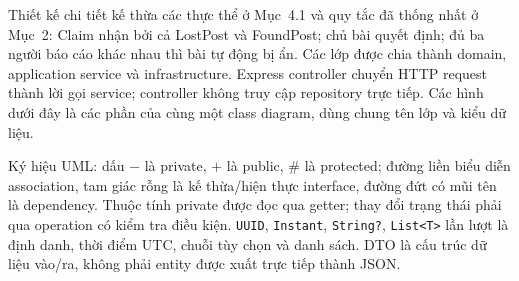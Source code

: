 Thiết kế chi tiết kế thừa các thực thể ở Mục~4.1 và quy tắc đã thống nhất ở Mục~2: Claim nhận bởi cả LostPost và FoundPost; chủ bài quyết định; đủ ba người báo cáo khác nhau thì bài tự động bị ẩn. Các lớp được chia thành domain, application service và infrastructure. Express controller chuyển HTTP request thành lời gọi service; controller không truy cập repository trực tiếp. Các hình dưới đây là các phần của cùng một class diagram, dùng chung tên lớp và kiểu dữ liệu.

Ký hiệu UML: dấu $-$ là private, $+$ là public, $\#$ là protected; đường liền biểu diễn association, tam giác rỗng là kế thừa/hiện thực interface, đường đứt có mũi tên là dependency. Thuộc tính private được đọc qua getter; thay đổi trạng thái phải qua operation có kiểm tra điều kiện. \texttt{UUID}, \texttt{Instant}, \texttt{String?}, \texttt{List<T>} lần lượt là định danh, thời điểm UTC, chuỗi tùy chọn và danh sách. DTO là cấu trúc dữ liệu vào/ra, không phải entity được xuất trực tiếp thành JSON.

